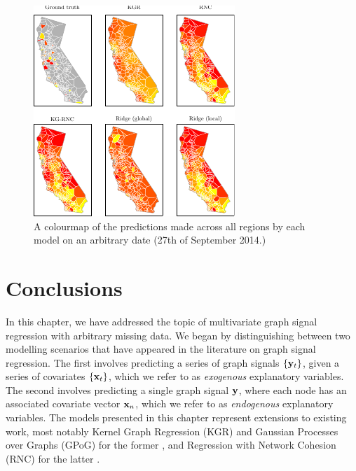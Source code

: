 \begin{figure}[h]
    \centering
    \vspace*{1cm}
    \includegraphics[width=0.8\linewidth]{Figures/cali_preds_map.pdf}
    \vspace*{0.5cm}
    \caption[Model predictions vs ground truth at a particular time]{A colourmap of the  predictions made across all regions by each model on an arbitrary date (27th of September 2014.) }
\end{figure}

\FloatBarrier



\section{Conclusions}

In this chapter, we have addressed the topic of multivariate graph signal regression with arbitrary missing data. We began by distinguishing between two modelling scenarios that have appeared in the literature on graph signal regression. The first involves predicting a series of graph signals $\{\mathbf{y}_t\}$, given a series of covariates $\{\mathbf{x}_t\}$, which we refer to as \textit{exogenous} explanatory variables. The second involves predicting a single graph signal $\mathbf{y}$, where each node has an associated covariate vector $\mathbf{x}_n$, which we refer to as \textit{endogenous} explanatory variables. The models presented in this chapter represent extensions to existing work, most notably Kernel Graph Regression (KGR)  and Gaussian Processes over Graphs (GPoG) for the former \citep{Venkitaraman2019,Venkitaraman2020}, and Regression with Network Cohesion (RNC) for the latter \citep{Li2019}. 

